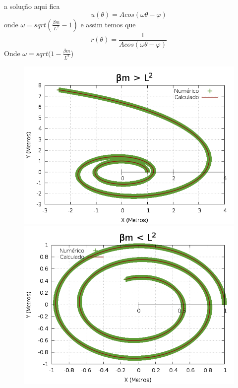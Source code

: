 \documentclass[a4paper,12pt]{exam}
\begin{document}
		a solução aqui fica \[ u(\theta) = Acos(\omega \theta - \varphi) \]
		onde $\omega = sqrt(\frac{\beta m}{L^2} - 1 )$
		e assim temos que
		\[ r(\theta) = \frac{1}{Acos(\omega \theta - \varphi)}\]
		Onde $\omega = sqrt(1- \frac{\beta m}{L^2}$)
		
		
		\begin{figure}[l]
			\centering
			\includegraphics[scale=0.3]{3o0.png}
			\includegraphics[scale=0.3]{3o1.png}

\end{figure}
\end{document}
